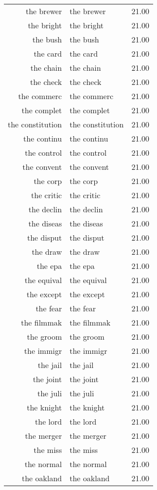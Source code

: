 \begin{table}[ht]
\begin{tabular}{rlr}
  the brewer & the brewer & 21.00 \\ 
  the bright & the bright & 21.00 \\ 
  the bush & the bush & 21.00 \\ 
  the card & the card & 21.00 \\ 
  the chain & the chain & 21.00 \\ 
  the check & the check & 21.00 \\ 
  the commerc & the commerc & 21.00 \\ 
  the complet & the complet & 21.00 \\ 
  the constitution & the constitution & 21.00 \\ 
  the continu & the continu & 21.00 \\ 
  the control & the control & 21.00 \\ 
  the convent & the convent & 21.00 \\ 
  the corp & the corp & 21.00 \\ 
  the critic & the critic & 21.00 \\ 
  the declin & the declin & 21.00 \\ 
  the diseas & the diseas & 21.00 \\ 
  the disput & the disput & 21.00 \\ 
  the draw & the draw & 21.00 \\ 
  the epa & the epa & 21.00 \\ 
  the equival & the equival & 21.00 \\ 
  the except & the except & 21.00 \\ 
  the fear & the fear & 21.00 \\ 
  the filmmak & the filmmak & 21.00 \\ 
  the groom & the groom & 21.00 \\ 
  the immigr & the immigr & 21.00 \\ 
  the jail & the jail & 21.00 \\ 
  the joint & the joint & 21.00 \\ 
  the juli & the juli & 21.00 \\ 
  the knight & the knight & 21.00 \\ 
  the lord & the lord & 21.00 \\ 
  the merger & the merger & 21.00 \\ 
  the miss & the miss & 21.00 \\ 
  the normal & the normal & 21.00 \\ 
  the oakland & the oakland & 21.00 \\ 

\end{tabular}
\end{table}
